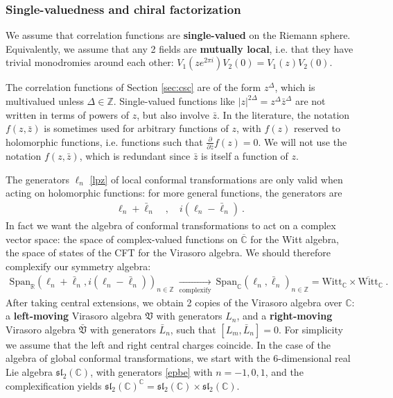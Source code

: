 \documentclass[12pt, a4paper]{article}
\newcommand{\myindex}[1]{\textbf{\boldmath #1}}
\begin{document}
\subsubsection{Single-valuedness and chiral factorization}

We assume that correlation functions are \myindex{single-valued} on the Riemann sphere. Equivalently, we assume that any 2 fields are \myindex{mutually local}, i.e. that they have trivial monodromies around each other: $V_1(ze^{2\pi i})V_2(0)=V_1(z)V_2(0)$. 

The correlation functions of Section \ref{sec:csc} are of the form $z^\Delta$, which is multivalued unless $\Delta\in\mathbb{Z}$. Single-valued functions like $|z|^{2\Delta}=z^\Delta\bar{z}^\Delta$ are not written in terms of powers of $z$, but also involve $\bar z$. In the literature, the notation $f(z,\bar z)$ is sometimes used for arbitrary functions of $z$, with $f(z)$ reserved to holomorphic functions, i.e. functions such that $\frac{\partial}{\partial \bar z} f(z) =0$. We will not use the notation $f(z,\bar z)$, which is redundant since $\bar z$ is itself a function of $z$.

The generators $\ell_n$ \eqref{lpz} of local conformal transformations are only valid when acting on holomorphic functions: for more general functions, the generators are
\begin{align}
 \ell_n +\bar{\ell}_n \quad , \quad i(\ell_n -\bar \ell_n)\  .
 \label{epbe}
\end{align}
In fact we want the algebra of conformal transformations to act on a complex vector space: the space of complex-valued functions on $\overline{\mathbb{C}}$ for the Witt algebra, the space of states of the CFT for the Virasoro algebra. We should therefore complexify our symmetry algebra:
\begin{align}
 \text{Span}_\mathbb{R}\left(\ell_n +\bar{\ell}_n , i(\ell_n -\bar \ell_n)\right)_{n\in\mathbb{Z}}\ \underset{\text{complexify}}{\longrightarrow}\ \text{Span}_\mathbb{C}\left(\ell_n , \bar \ell_n\right)_{n\in\mathbb{Z}}=\text{Witt}_\mathbb{C}\times \overline{\text{Witt}}_\mathbb{C}\ .
\end{align}
After taking central extensions, we obtain 2 copies of the Virasoro algebra over $\mathbb{C}$: a \myindex{left-moving}  Virasoro algebra $\mathfrak{V}$ with generators $L_n$, and a \myindex{right-moving} Virasoro algebra $\bar{\mathfrak{V}}$ with generators $\bar{L}_n$, such that $[L_m,\bar L_n]=0$. For simplicity we assume that the left and right central charges coincide.
In the case of the algebra of global conformal transformations, we start with the 6-dimensional real Lie algebra $\mathfrak{sl}_2(\mathbb{C})$, with generators \eqref{epbe} with $n=-1,0,1$, and the complexification yields $\mathfrak{sl}_2(\mathbb{C})^\mathbb{C} = \mathfrak{sl}_2(\mathbb{C})\times \mathfrak{sl}_2(\mathbb{C})$.
\end{document}
